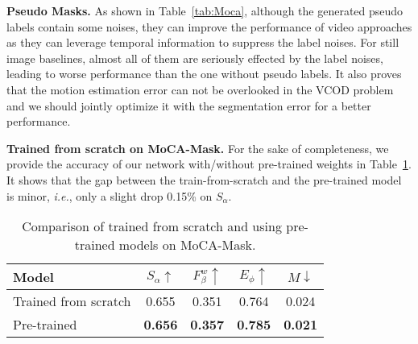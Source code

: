 \documentclass[10pt,twocolumn,letterpaper]{article}
\def\ie{\emph{i.e.}}
\def\tabref#1{Table~\ref{#1}}
\begin{document}
\textbf{Pseudo Masks.} As shown in \tabref{tab:Moca}, although the generated pseudo labels contain some noises, they can improve the performance of video approaches as they can leverage temporal information to suppress the label noises. For still image baselines, almost all of them are seriously effected by the label noises, leading to worse performance than the one without pseudo labels. It also proves that the motion estimation error can not be overlooked in the VCOD problem and we should jointly optimize it with the segmentation error for a better performance. 

\textbf{Trained from scratch on MoCA-Mask.} 
For the sake of completeness, we provide the accuracy of our network with/without pre-trained weights in Table~\ref{tab:train_from_scratch}. It shows that the gap between the train-from-scratch and the pre-trained model is minor, \ie, only a slight drop 0.15\% on $S_\alpha$.

\begin{table}[h!]
    \footnotesize
    \centering
    \caption{Comparison of trained from scratch and using pre-trained models on MoCA-Mask.  }
    \label{tab:train_from_scratch}
    \vspace{-10pt}
    \tabcolsep=0.2cm
    \renewcommand{\arraystretch}{0.5}
    \begin{tabular}{l|cccc}
    \toprule
      Model  & $S_\alpha\uparrow$ &$F_\beta^w\uparrow$  &$E_\phi\uparrow$ &$M\downarrow$ \\
     \midrule
     Trained from scratch & 0.655 & 0.351 & 0.764 & 0.024 \\
     Pre-trained & \textbf{0.656} &  \textbf{0.357} & \textbf{0.785}  & \textbf{0.021} \\
    \bottomrule
    \end{tabular}
\vspace{-5pt}
\end{table}
\end{document}
